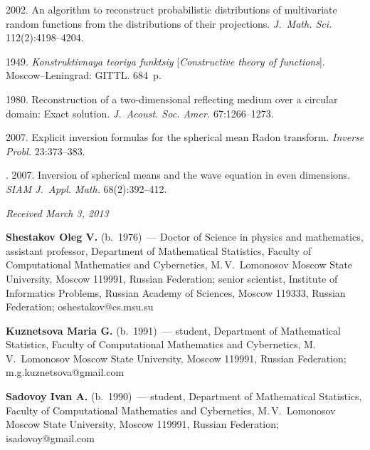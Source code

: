 \begin{multicols}{2}
{{\begin{thebibliography}{99}
 2002.
An algorithm to reconstruct probabilistic distributions of multivariate random functions from the
distributions of their projections. \textit{J.~Math. Sci.} 112(2):4198--4204.

 1949.
\textit{Konstruktivnaya teoriya funktsiy} 
[\textit{Constructive theory of functions}]. Moscow--Le\-nin\-grad: GITTL. 684~p.

  1980.
Reconstruction of a two-dimensional reflecting medium over a circular domain: Exact solution.
\textit{J.~Acoust. Soc. Amer.} 67:1266--1273.

  2007.
Explicit inversion formulas for the spherical mean Radon transform.
\textit{Inverse Probl.} 23:373--383.



. 2007. Inversion of spherical
means and the wave equation in even dimensions. \textit{SIAM J.~Appl.
Math.} 68(2):392--412.
\end{thebibliography}
} }


\end{multicols}

\hfill{\small\textit{Received March 3, 2013}}

\Contr

\noindent
\textbf{Shestakov Oleg V.} (b.\ 1976)~--- Doctor of Science in physics and mathematics, 
assistant professor, Department of Mathematical Statistics, Faculty of 
Computational Mathematics and Cybernetics, M.\,V.~Lomonosov Moscow State 
University, Moscow 119991, Russian Federation; senior scientist, Institute of Informatics Problems, Russian 
Academy of Sciences, Moscow 119333, Russian Federation; oshestakov@cs.msu.su

\vspace*{3pt}

\noindent
\textbf{Kuznetsova Maria G.} (b.\ 1991)~--- student, Department of Mathematical Statistics, 
Faculty of Computational Mathematics and Cybernetics, M.\,V.~Lomonosov Moscow 
State University, Moscow 119991, Russian Federation; m.g.kuznetsova@gmail.com

\vspace*{3pt}

\noindent
\textbf{Sadovoy Ivan A.} (b.\ 1990)~--- student, Department of Mathematical Statistics, 
Faculty of Computational Mathematics and Cybernetics, M.\,V.~Lomonosov Moscow 
State University, Moscow 119991, Russian Federation; isadovoy@gmail.com

 \label{end\stat}


\renewcommand{\bibname}{\protect\rm Литература}